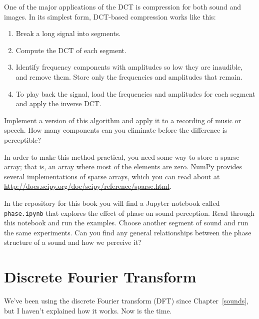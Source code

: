 \documentclass[12pt]{book}
\begin{document}
\begin{exercise}
One of the major applications of the DCT is compression for both
sound and images.  In its simplest form, DCT-based compression
works like this:

\begin{enumerate}

\item Break a long signal into segments.

\item Compute the DCT of each segment.

\item Identify frequency components with amplitudes so low they are
  inaudible, and remove them.  Store only the frequencies and
  amplitudes that remain.

\item To play back the signal, load the frequencies and amplitudes
  for each segment and apply the inverse DCT.

\end{enumerate}

Implement a version of this algorithm and apply it to a recording
of music or speech.  How many components can you eliminate before
the difference is perceptible?

In order to make this method practical, you need some way to store a
sparse array; that is, an array where most of the elements are zero.
NumPy provides several implementations of sparse arrays, which you can
read about at
\url{http://docs.scipy.org/doc/scipy/reference/sparse.html}.
\end{exercise}


\begin{exercise}
In the repository for this book you will find a Jupyter notebook
called \verb"phase.ipynb" that explores the effect of phase on sound
perception.
Read through this notebook and run the examples.
Choose another segment of sound and run the same experiments.
Can you find any general relationships between the phase structure
of a sound and how we perceive it?
\end{exercise}




\chapter{Discrete Fourier Transform}
\label{dft}

We've been using the discrete Fourier transform (DFT) since
Chapter~\ref{sounds}, but I haven't explained how it works.  Now is
the time.
\end{document}
